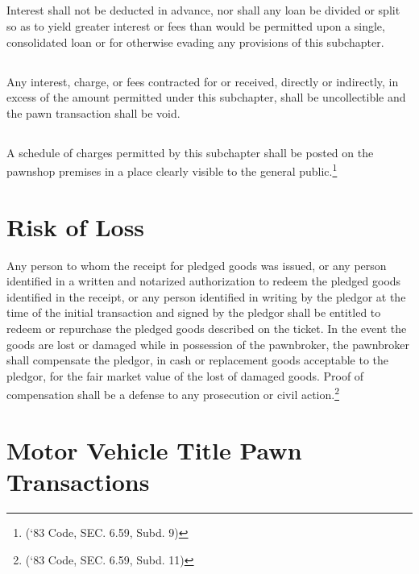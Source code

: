 \subsection{}
Interest shall not be deducted in advance, nor shall any loan be divided or split so as to yield greater interest or fees than would be permitted upon a single, consolidated loan or for otherwise evading any provisions of this subchapter.
\subsection{}
Any interest, charge, or fees contracted for or received, directly or indirectly, in excess of the amount permitted under this subchapter, shall be uncollectible and the pawn transaction shall be void.
\subsection{}
A schedule of charges permitted by this subchapter shall be posted on the pawnshop premises in a place clearly visible to the general public.\footnote{(‘83 Code, SEC. 6.59, Subd. 9)}

\section{Risk of Loss}
Any person to whom the receipt for pledged goods was issued, or any person identified in a written and notarized authorization to redeem the pledged goods identified in the receipt, or any person identified in writing by the pledgor at the time of the initial transaction and signed by the pledgor shall be entitled to redeem or repurchase the pledged goods described on the ticket.  In the event the goods are lost or damaged while in possession of the pawnbroker, the pawnbroker shall compensate the pledgor, in cash or replacement goods acceptable to the pledgor, for the fair market value of the lost of damaged goods.  Proof of compensation shall be a defense to any prosecution or civil action.\footnote{(‘83 Code, SEC. 6.59, Subd. 11)}

\section{Motor Vehicle Title Pawn Transactions}
